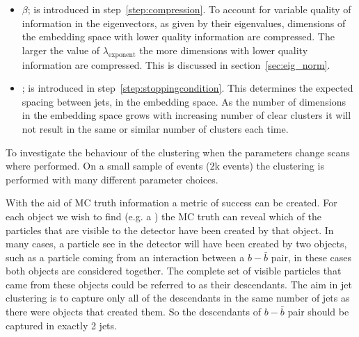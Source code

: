 \begin{itemize}
       \item  \(\beta\); is introduced in step~\ref{step:compression}.
           To account for variable quality of information in the eigenvectors, as given by their eigenvalues,
        dimensions of the embedding space with lower quality information are compressed.
        The larger the value of \(\lambda_\text{exponent}\) the more dimensions with lower quality information are compressed.
        This is discussed in section~\ref{sec:eig_norm}.
    \item \stoppingdeltar{}; is introduced in step~\ref{step:stoppingcondition}.
         This determines the expected spacing between jets, in the embedding space.
         As the number of dimensions in the embedding space grows with increasing 
         number of clear clusters it will not result in the same or
         similar number of clusters each time.

\end{itemize}



To investigate the behaviour of the clustering when the parameters change scans where performed.
On a small sample of events (\(2\)k events) the clustering is performed with many different parameter choices.

With the aid of MC truth information a metric of success can be created.
For each object we wish to find (e.g. a ) 
the MC truth can reveal which of the particles that are visible to the detector have
been created by that object.
In many cases, a particle see in the detector will have been created by two objects,
such as a particle coming from an interaction between a \(b-\bar{b}\) pair,
in these cases both objects are considered together.
The complete set of visible particles that came from these objects could be referred to as their descendants.
The aim in jet clustering is to capture only all of the descendants in the same number of jets as there were objects that created them.
So the descendants of \(b-\bar{b}\) pair should be captured in exactly 2 jets.

